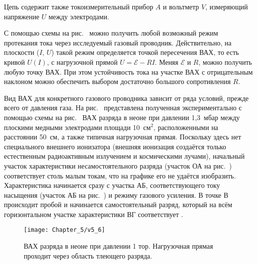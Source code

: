 Цепь содержит также токоизмерительный прибор $A$ и вольтметр $V$, измеряющий
напряжение $U$ между электродами.

С помощью схемы на рис.~ можно получить любой
возможный режим протекания тока через исследуемый газовый проводник.
Действительно, на плоскости ($I$, $U$) такой режим определяется точкой
пересечения ВАХ, то есть кривой $U(I)$, с
нагрузочной прямой $U=\mathcal{E}-RI$. Меняя $\mathcal{E}$ и $R$, можно получить
любую точку ВАХ. При этом устойчивость тока на участке
ВАХ с отрицательным наклоном можно обеспечить выбором достаточно большого
сопротивления $R$.

Вид ВАХ для конкретного газового проводника зависит от ряда условий, прежде
всего от давления газа. На рис.~
представлена полученная экспериментально с помощью схемы на рис.~ ВАХ разряда в неоне при давлении 1,3~мбар между плоскими
медными электродами площади 10~см$^2$, расположенными на расстоянии 50~см, а
также типичная нагрузочная прямая. Поскольку
здесь нет специального внешнего ионизатора (внешняя ионизация создаётся только
естественным радиоактивным излучением и
космическими лучами), начальный участок характеристики несамостоятельного
разряда (участок ОА на рис.~) соответствует
столь малым токам, что на графике его не удаётся изобразить. Характеристика
начинается сразу с участка АБ,
соответствующего току насыщения (участок АБ на рис.~) и режиму газового усиления. В точке В происходит пробой и
начинается самостоятельный разряд, который на всём горизонтальном участке
характеристики ВГ соответствует .

\begin{figure}[h!]
	\centering
	\texttt{[image: Chapter\_5/v5\_6]}
	\caption{ВАХ разряда в неоне при давлении 1 тор. Нагрузочная прямая проходит
через область тлеющего разряда.}
\end{figure}

